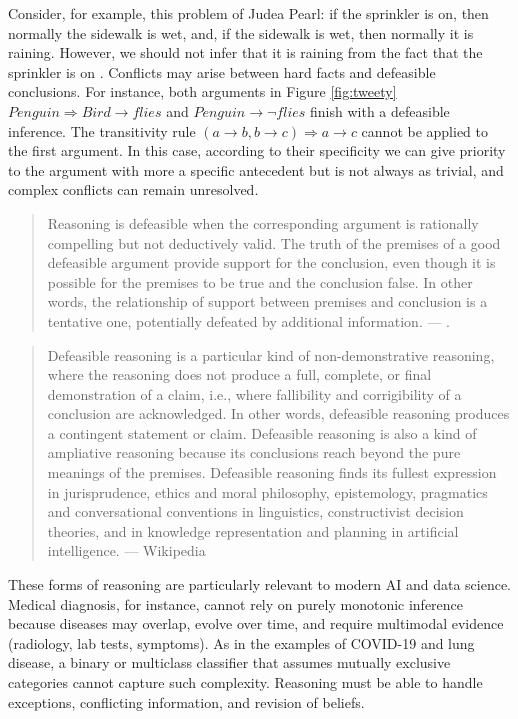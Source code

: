 \documentclass[
  12pt,
]{book}
\begin{document}
Consider, for example, this problem of Judea Pearl: if the sprinkler is on, then normally the sidewalk is wet, and, if the sidewalk is wet, then normally it is raining. However, we should not infer that it is raining from the fact that the sprinkler is on \citep{pearl2014probabilistic}. Conflicts may arise between hard facts and defeasible conclusions. For instance, both arguments in Figure \ref{fig:tweety} \(Penguin ⇒ Bird → flies\) and \(Penguin → ¬flies\) finish with a defeasible inference. The transitivity rule \((a → b, b → c) ⇒ a → c\) cannot be applied to the first argument. In this case, according to their specificity we can give priority to the argument with more a specific antecedent but is not always as trivial, and complex conflicts can remain unresolved.

\begin{quote}
Reasoning is defeasible when the corresponding argument is rationally compelling but not deductively valid. The truth of the premises of a good defeasible argument provide support for the conclusion, even though it is possible for the premises to be true and the conclusion false. In other words, the relationship of support between premises and conclusion is a tentative one, potentially defeated by additional information. --- \citep{sep-reasoning-defeasible}.
\end{quote}

\begin{quote}
Defeasible reasoning is a particular kind of non-demonstrative reasoning, where the reasoning does not produce a full, complete, or final demonstration of a claim, i.e., where fallibility and corrigibility of a conclusion are acknowledged. In other words, defeasible reasoning produces a contingent statement or claim. Defeasible reasoning is also a kind of ampliative reasoning because its conclusions reach beyond the pure meanings of the premises. Defeasible reasoning finds its fullest expression in jurisprudence, ethics and moral philosophy, epistemology, pragmatics and conversational conventions in linguistics, constructivist decision theories, and in knowledge representation and planning in artificial intelligence. --- Wikipedia
\end{quote}

These forms of reasoning are particularly relevant to modern AI and data science. Medical diagnosis, for instance, cannot rely on purely monotonic inference because diseases may overlap, evolve over time, and require multimodal evidence (radiology, lab tests, symptoms). As in the examples of COVID-19 and lung disease, a binary or multiclass classifier that assumes mutually exclusive categories cannot capture such complexity. Reasoning must be able to handle exceptions, conflicting information, and revision of beliefs.
\end{document}
